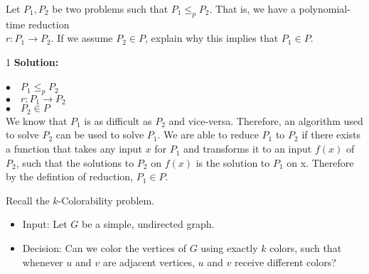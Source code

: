 \documentclass[9pt]{article}
\def\solutions{1}
\begin{document}
\item Let $P_1, P_2$ be two problems such that $P_1 \leq_p P_2$. That is, we have a polynomial-time reduction \\$r : P_1 \rightarrow P_2$. If we assume $P_2 \in P$, explain why this implies that $P_1 \in P$.


\if\solutions1
 \vspace{2mm}
 \phantom{Test}
 \textbf{Solution:}   \\
 \phantom{Test}\\
$\bullet \quad P_1 \leq_p P_2$\\
$\bullet \quad r : P_1 \rightarrow P_2$\\
$\bullet \quad P_2 \in P$\\

We know that $P_1$ is as difficult as $P_2$ and vice-versa. Therefore, an algorithm used to solve $P_2$ can be used to solve $P_1$. We are able to reduce $P_1$ to $P_2$ if there exists a function that takes any input $x$ for $P_1$ and transforms it to an input $f(x)$ of $P_2$, such that the solutions to $P_2$ on $f(x)$ is the solution to $P_1$ on x. Therefore by the defintion of reduction, $P_1 \in P$.


\fi

\newpage

\phantom{Test}

\vspace{5mm}

\item Recall the $k$-\textsf{Colorability} problem.
\begin{itemize}
\item \textsf{Input:} Let $G$ be a simple, undirected graph.
\item \textsf{Decision:} Can we color the vertices of $G$ using exactly $k$ colors, such that whenever $u$ and $v$ are adjacent vertices, $u$ and $v$ receive different colors?
\end{itemize}
\end{document}
